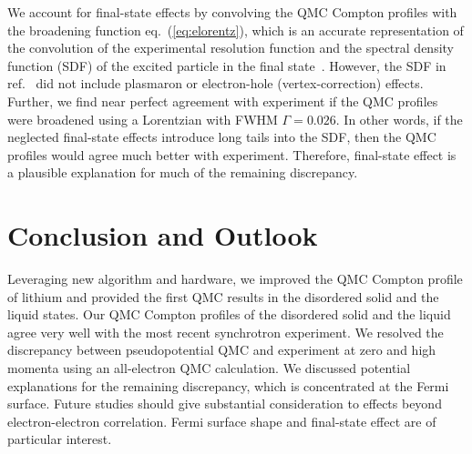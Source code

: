 \documentclass[aps,prb,showpacs,preprintnumbers,amsmath,amssymb,superscriptaddress,twocolumn]{revtex4-1}
\begin{document}
We account for final-state effects by convolving the QMC Compton profiles with the broadening function eq.~(\ref{eq:elorentz}), which is an accurate representation of the convolution of the experimental resolution function and the spectral density function (SDF) of the excited particle in the final state~\cite{Soininen2001}. However, the SDF in ref.~\cite{Soininen2001} did not include plasmaron or electron-hole (vertex-correction) effects. Further, we find near perfect agreement with experiment if the QMC profiles were broadened using a Lorentzian with FWHM $\Gamma=0.026$. In other words, if the neglected final-state effects introduce long tails into the SDF, then the QMC profiles would agree much better with experiment. Therefore, final-state effect is a plausible explanation for much of the remaining discrepancy.




\section{Conclusion and Outlook}

Leveraging new algorithm and hardware, we improved the QMC Compton profile of lithium and provided the first QMC results in the disordered solid and the liquid states. Our QMC Compton profiles of the disordered solid and the liquid agree very well with the most recent synchrotron experiment. We resolved the discrepancy between pseudopotential QMC and experiment at zero and high momenta using an all-electron QMC calculation. We discussed potential explanations for the remaining discrepancy, which is concentrated at the Fermi surface. Future studies should give substantial consideration to effects beyond electron-electron correlation. Fermi surface shape and final-state effect are of particular interest.%
\end{document}
